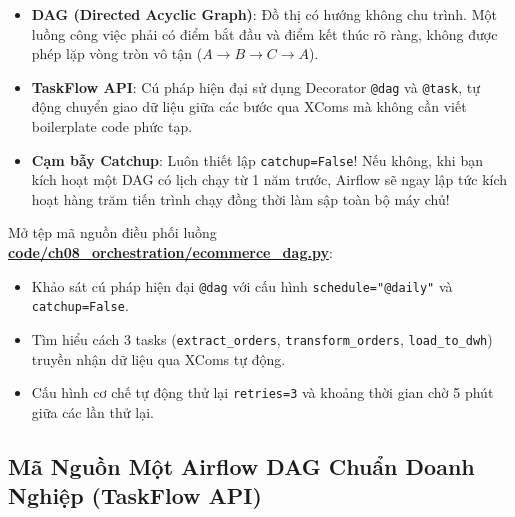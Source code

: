 \begin{lythuyetbox}
\begin{itemize}
    \item \textbf{DAG (Directed Acyclic Graph)}: Đồ thị có hướng không chu trình. Một luồng công việc phải có điểm bắt đầu và điểm kết thúc rõ ràng, không được phép lặp vòng tròn vô tận ($A \rightarrow B \rightarrow C \rightarrow A$).
    \item \textbf{TaskFlow API}: Cú pháp hiện đại sử dụng Decorator \texttt{@dag} và \texttt{@task}, tự động chuyển giao dữ liệu giữa các bước qua XComs mà không cần viết boilerplate code phức tạp.
    \item \textbf{Cạm bẫy Catchup}: Luôn thiết lập \texttt{catchup=False}! Nếu không, khi bạn kích hoạt một DAG có lịch chạy từ 1 năm trước, Airflow sẽ ngay lập tức kích hoạt hàng trăm tiến trình chạy đồng thời làm sập toàn bộ máy chủ!
\end{itemize}
\end{lythuyetbox}

\begin{handsonlabbox}
Mở tệp mã nguồn điều phối luồng \href{run:./code/ch08_orchestration/ecommerce_dag.py}{\textbf{code/ch08\_orchestration/ecommerce\_dag.py}}:
\begin{itemize}
    \item Khảo sát cú pháp hiện đại \texttt{@dag} với cấu hình \texttt{schedule="@daily"} và \texttt{catchup=False}.
    \item Tìm hiểu cách 3 tasks (\texttt{extract\_orders}, \texttt{transform\_orders}, \texttt{load\_to\_dwh}) truyền nhận dữ liệu qua XComs tự động.
    \item Cấu hình cơ chế tự động thử lại \texttt{retries=3} và khoảng thời gian chờ 5 phút giữa các lần thử lại.
\end{itemize}
\end{handsonlabbox}

\subsection{Mã Nguồn Một Airflow DAG Chuẩn Doanh Nghiệp (TaskFlow API)}


